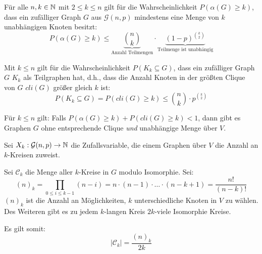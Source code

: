 \begin{lemma}
    \label{lem:independent-prob}
    Für alle $ n, k \in \mathbb{N} $ mit $ 2 \leq k \leq n $ gilt für die Wahrscheinlichkeit $ P(\alpha(G) \geq k) $, dass ein zufälliger Graph $ G $ aus $ \mathcal{G}(n, p) $ mindestens eine Menge von $ k $ unabhängigen Knoten besitzt:
    \begin{equation*}
        P(\alpha(G) \geq k) \leq \underbrace{\binom{n}{k}}_{\text{Anzahl Teilmengen}} \cdot \underbrace{(1 - p)^{\binom{k}{2}}}_{\text{Teilmenge ist unabhängig}}
    \end{equation*}
\end{lemma}

\begin{lemma}
    Mit $ k \leq n $ gilt für die Wahrscheinlichkeit $ P(K_k \subseteq G) $, dass ein zufälliger Graph $ G $ $ K_k $ als Teilgraphen hat, d.h., dass die Anzahl Knoten in der größten Clique von $ G $ $ cli(G) $ größer gleich $ k $ ist:
    \begin{equation*}
        P(K_k \subseteq G) = P(cli(G) \geq k) \leq \binom{n}{k} \cdot p^{\binom{k}{2}}
    \end{equation*}
\end{lemma}

\begin{lemma}
    Für $ k \leq n $ gilt: Falls $ P(\alpha(G) \geq k) + P(cli(G) \geq k) < 1 $, dann gibt es Graphen $ G $ ohne entsprechende Clique \textit{und} unabhängige Menge über $ V $.
\end{lemma}

\begin{definition}
    Sei $ X_k : \mathcal{G}(n, p) \rightarrow \mathbb{N} $ die Zufallsvariable, die einem Graphen über $ V $ die Anzahl an $ k $-Kreisen zuweist.
\end{definition}

\begin{proposition}
    Sei $ \mathcal{C}_k $ die Menge aller $ k $-Kreise in $ G $ modulo Isomorphie.
    Sei:
    \begin{equation*}
        (n)_k = \prod_{0 \leq i \leq k - 1} (n - i) = n \cdot (n - 1) \cdot \dots \cdot (n - k + 1) = \frac{n!}{(n - k)!}
    \end{equation*}
    $ (n)_k $ ist die Anzahl an Möglichkeiten, $ k $ unterschiedliche Knoten in $ V $ zu wählen.
    Des Weiteren gibt es zu jedem $ k $-langen Kreis $ 2k $-viele Isomorphie Kreise.

    Es gilt somit:
    \begin{equation*}
        |\mathcal{C}_k| = \frac{(n)_k}{2k}
    \end{equation*}
\end{proposition}

